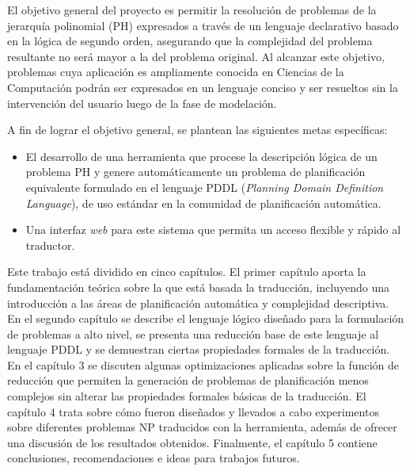El objetivo general del proyecto es permitir la resolución de problemas
de la jerarquía polinomial (PH) expresados a través de un lenguaje declarativo basado en 
la lógica de segundo orden, asegurando que la complejidad del problema
resultante no será mayor a la del problema original. Al alcanzar este objetivo, problemas cuya aplicación es
ampliamente conocida en Ciencias de la Computación podrán ser expresados
en un lenguaje conciso y ser resueltos sin la intervención del usuario luego de
la fase de modelación.

A fin de lograr el objetivo general, se plantean las siguientes metas
específicas:
\begin{itemize}
\item El desarrollo de una herramienta que procese la descripción lógica de un problema 
PH y genere automáticamente un problema de planificación equivalente 
formulado en el lenguaje PDDL (\textit{Planning Domain Definition Language}),
de uso estándar en la comunidad de planificación automática.
\item Una interfaz \textit{web} para este sistema que permita un acceso flexible
y rápido al traductor.
\end{itemize}

Este trabajo está dividido en cinco capítulos. El primer capítulo aporta la
fundamentación teórica sobre la que está basada la traducción, incluyendo una
introducción a las áreas de planificación automática y complejidad descriptiva.
En el segundo capítulo se describe el lenguaje lógico diseñado para la
formulación de problemas a alto nivel, se presenta una reducción base de este
lenguaje al lenguaje PDDL y se demuestran ciertas propiedades formales de la
traducción. En el capítulo 3 se discuten algunas optimizaciones aplicadas sobre
la función de reducción que permiten la generación de problemas de
planificación menos complejos sin alterar las propiedades formales básicas de
la traducción. El capítulo 4 trata sobre cómo fueron diseñados y llevados a
cabo experimentos sobre diferentes problemas NP traducidos con la herramienta,
además de ofrecer una discusión de los resultados obtenidos. Finalmente, el
capítulo 5 contiene conclusiones, recomendaciones e ideas para trabajos
futuros.

